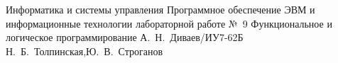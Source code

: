 \documentclass[a4paper,oneside,14pt]{extarticle}
\begin{document}
\makereporttitle
    {Информатика и системы управления} %
    {Программное обеспечение ЭВМ и информационные технологии} %
    {лабораторной работе №~9} %
    {Функциональное и логическое программирование} %
    {} %
    {} %
    {А.~Н.~Диваев/ИУ7-62Б} %
    {Н.~Б.~Толпинская,Ю.~В.~Строганов} %

\setcounter{page}{2}





\end{document}
